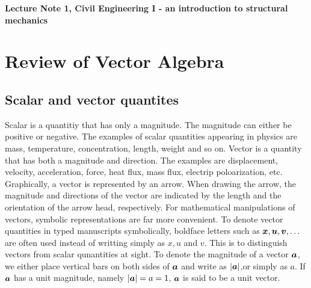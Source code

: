 \documentclass[10pt,a4j]{jarticle}
\newlength{\minitwocolumn}
\begin{document}
\newcommand{\fat}[1]{\mbox{\boldmath $#1$}}
\newcommand{\D}{\partial}
\newcommand{\w}{\omega}
\newcommand{\ga}{\alpha}
\newcommand{\gb}{\beta}
\newcommand{\gx}{\xi}
\newcommand{\gz}{\zeta}
\newcommand{\vhat}[1]{\hat{\fat{#1}}}
\newcommand{\spc}{\vspace{0.7\baselineskip}}
\newcommand{\halfspc}{\vspace{0.3\baselineskip}}

\newcommand{\twofig}[2]
 {
   \begin{figure}
     \begin{minipage}[t]{\minitwocolumn}
         \begin{center}   #1
         \end{center}
     \end{minipage}
         \hspace{\columnsep}
     \begin{minipage}[t]{\minitwocolumn}
         \begin{center} #2
         \end{center}
     \end{minipage}
   \end{figure}
 }
\begin{center}
	{\Large \bf Lecture Note 1, Civil Engineering I - an introduction to structural mechanics}  \\
\end{center}
\section{Review of Vector Algebra}
\subsection{Scalar and vector quantites}
Scalar is a quantitiy that has only a magnitude.
The magnitude  can either be positive or negative. 
The examples of scalar quantities appearing in physics are 
mass, temperature, concentration, length, weight and so on.
Vector is a quantity that has both a magnitude and direction. 
The examples are displacement, velocity, acceleration, 
force, heat flux, mass flux, electrip poloarization, etc. 
Graphically, a vector is represented by an arrow. 
When drawing the arrow, the magnitude and directions of the vector 
are indicated by the length and the orientation of the arrow head, 
respectively. For mathematical manipulations of vectors, symbolic 
representations are far more convenient. 
To denote vector quantities in typed manuscripts symbolically, 
boldface letters such as $\fat{x},\fat{u},\fat{v},\dots$ 
are often used instead of writting simply as $x, u$ and $v$.
This is to distinguish vectors from scalar qunantities at sight. 
To denote the magnitude of a vector $\fat{a}$, we either 
place vertical bars on both sides of $\fat{a}$ and write 
as $|\fat{a}|$,or simply as $a$.
If $\fat{a}$ has a unit magnitude, namely $|\fat{a}|=a=1$, 
$\fat{a}$ is said to be a unit vector. 
\end{document}
